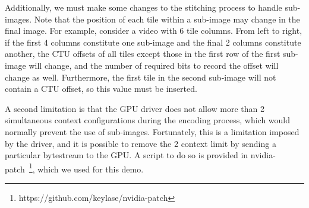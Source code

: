 Additionally, we must make some changes to the stitching process to handle sub-images. Note that the position of each tile within a sub-image may change in the final image. For example, consider a video with 6 tile columns. From left to right, if the first 4 columns constitute one sub-image and the final 2 columns constitute another, the CTU offsets of all tiles except those in the first row of the first sub-image will change, and the number of required bits to record the offset will change as well. Furthermore, the first tile in the second sub-image will not contain a CTU offset, so this value must be inserted.

A second limitation is that the GPU driver does not allow more than 2 simultaneous context configurations during the encoding process, which would normally prevent the use of sub-images. Fortunately, this is a limitation imposed by the driver, and it is possible to remove the 2 context limit by sending a particular bytestream to the GPU. A script to do so is provided in nvidia-patch~\footnote{https://github.com/keylase/nvidia-patch}, which we used for this demo.












